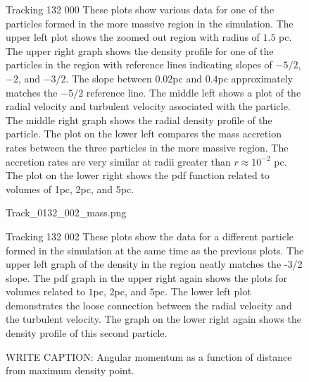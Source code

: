 \documentclass{emulateapj}
\begin{document}
\begin{figure}
\caption{Tracking 132 000  These plots show various data for one of the particles formed in the more massive region in the simulation.  The upper left plot shows the zoomed out region with radius of $1.5$ pc. The upper right graph shows the density profile for one of the particles in the region with reference lines indicating slopes of $-5/2$, $-2$, and $-3/2$.  The slope between $0.02$pc and $0.4$pc approximately matches the $-5/2$ reference line.  The middle left shows a plot of the radial velocity and turbulent velocity associated with the particle.    The middle right graph shows the radial density profile of the particle.  The plot on the lower left compares the mass accretion rates between the three particles in the more massive region.  The accretion rates are very similar at radii greater than $r \approx 10^{-2}$ pc.  The plot on the lower right shows the pdf function related to volumes of 1pc, 2pc, and 5pc.    \label{fig:132 000 graphs}}
\end{figure}

\begin{figure}
 {Track_0132_002_mass.png}
\caption{Tracking 132 002  These plots show the data for a different particle formed in the simulation at the same time as the previous plots.  The upper left graph of the density in the region neatly matches the -3/2 slope.  The pdf graph in the upper right again shows the plots for volumes related to $1$pc, $2$pc, and $5$pc.  The lower left plot demonstrates the loose connection between the radial velocity and the turbulent velocity.  The graph on the lower right again shows the density profile of this second particle.     \label{fig:132_002_graphs}}
\end{figure}




\begin{figure}
\caption{WRITE CAPTION: Angular momentum as a function of distance from maximum density point.     \label{fig:angular_momentum_example}}
\end{figure}

\end{document}
